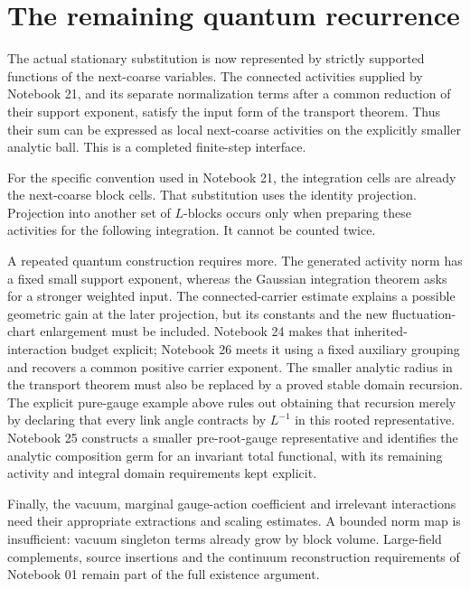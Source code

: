 \section{The remaining quantum recurrence}
\label{ct22-next}

The actual stationary substitution is now represented by
strictly supported functions of the next-coarse variables.
The connected activities supplied by Notebook 21, and its
separate normalization terms after a common reduction of
their support exponent, satisfy the input form of the
transport theorem. Thus their sum can be expressed as
local next-coarse activities on the explicitly smaller
analytic ball. This is a completed finite-step interface.

For the specific convention used in Notebook 21, the
integration cells are already the next-coarse block cells.
That substitution uses the identity projection. Projection
into another set of $L$-blocks occurs only when preparing
these activities for the following integration. It cannot
be counted twice.

A repeated quantum construction requires more. The generated
activity norm has a fixed small support exponent, whereas the
Gaussian integration theorem asks for a stronger weighted
input. The connected-carrier estimate explains a possible
geometric gain at the later projection, but its constants
and the new fluctuation-chart enlargement must be included.
Notebook 24 makes that inherited-interaction budget explicit;
Notebook 26 meets it using a fixed auxiliary grouping and
recovers a common positive carrier exponent.
The smaller analytic radius in the transport theorem must
also be replaced by a proved stable domain recursion.
The explicit pure-gauge example above rules out obtaining
that recursion merely by declaring that every link angle
contracts by $L^{-1}$ in this rooted representative.
Notebook 25 constructs a smaller pre-root-gauge representative
and identifies the analytic composition germ for an invariant
total functional, with its remaining activity and integral
domain requirements kept explicit.

Finally, the vacuum, marginal gauge-action coefficient and
irrelevant interactions need their appropriate extractions
and scaling estimates. A bounded norm map is insufficient:
vacuum singleton terms already grow by block volume.
Large-field complements, source insertions and the continuum
reconstruction requirements of Notebook 01 remain part of
the full existence argument.


